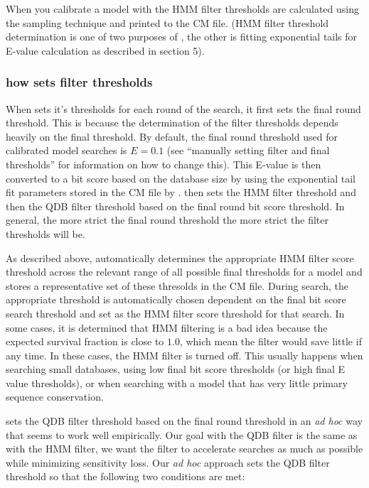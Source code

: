 When you calibrate a model with  the HMM filter
thresholds are calculated using the sampling technique and printed to
the CM file. (HMM filter threshold determination is one of two
purposes of , the other is fitting exponential tails
for E-value calculation as described in section 5).

\subsubsection{how  sets filter thresholds}
When  sets it's thresholds for each round of the
search, it first sets the final round threshold. This is because the
determination of the filter thresholds depends heavily on the final
threshold. By default, the final round threshold used for calibrated
model searches is $E=0.1$ (see ``manually setting filter and final
thresholds'' for information on how to change this). 
This E-value is then converted to a bit score based on the database
size by using the exponential tail fit parameters stored in the CM
file by .  then sets the HMM filter
threshold and then the QDB filter threshold based on the final round
bit score threshold. In general, the more strict the final round
threshold the more strict the filter thresholds will be. 

As described above,  automatically determines the
appropriate HMM filter score threshold across the relevant range of
all possible final thresholds for a model and stores a representative
set of these thresolds in the CM file. During search, the appropriate
threshold is automatically chosen dependent on the final bit score
search threshold and set as the HMM filter score threshold for that
search.
In some cases, it is determined that HMM filtering is a
bad idea because the expected survival fraction is close to $1.0$,
which mean the filter would save little if any time. In these cases,
the HMM filter is turned off. This usually happens when searching
small databases, using low final bit score thresholds (or high final E
value thresholds), or when searching with a model that has very little
primary sequence conservation.

 sets the QDB filter threshold based on the final round
threshold in an \emph{ad hoc} way that seems to work well
empirically. Our goal with the QDB filter is the same as with the HMM
filter, we want the filter to accelerate searches as much as possible
while minimizing sensitivity loss. Our \emph{ad hoc} approach 
sets the QDB filter threshold so that the following two conditions are
met:

